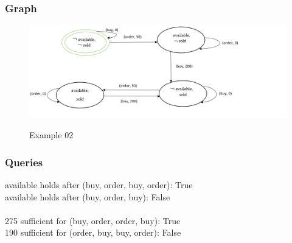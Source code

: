 \documentclass[11pt]{article}
\begin{document}
	\subsubsection{Graph}\label{par:p402}
	\begin{figure}[H]
		\includegraphics[width=1.2\linewidth, height=0.4\textheight]{./media/example2_graph.png}
		\label{Figure:f02}
		\caption{Example 02}
	\end{figure}
	\subsubsection{Queries}
	available holds after (buy, order, buy, order): True\\
	available holds after (buy, order, buy): False\\
	\\
	275 sufficient for (buy, order, order, buy): True\\
	190 sufficient for (order, buy, buy, order): False\\
\end{document}
